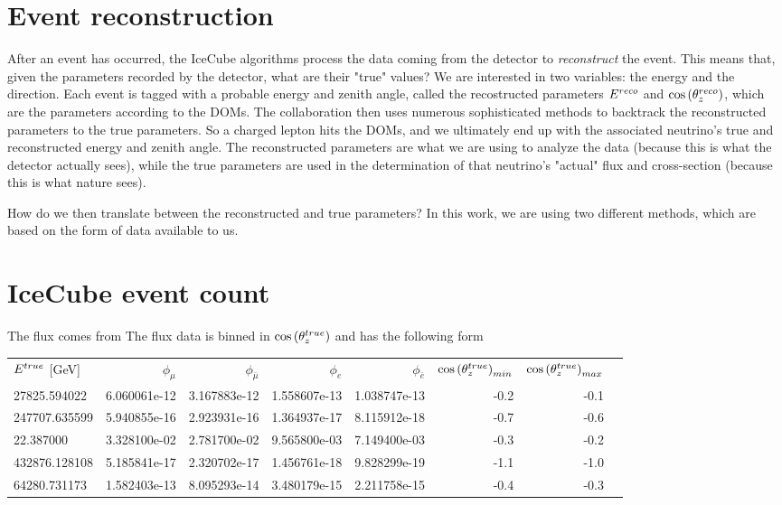 \documentclass[draft=True]{thesis}
\begin{document}
\section{Event reconstruction}
After an event has occurred, the IceCube algorithms process the data coming from the detector to \emph{reconstruct} the event. This means that, given the parameters recorded by the detector, what are their "true" values?
We are interested in two variables: the energy and the direction. Each event is tagged with a probable energy and zenith angle, called the recostructed parameters $E^{reco}$ and $\cos{(\theta_z^{reco})}$, which are the parameters according to the DOMs.
The collaboration then uses numerous sophisticated methods to backtrack the reconstructed parameters to the true parameters. So a charged lepton hits the DOMs, and we ultimately end up with the associated neutrino's true and reconstructed energy and zenith angle. The reconstructed parameters are what we are using to analyze the data (because this is what the detector actually sees), while the true parameters are used in the determination of that neutrino's "actual" flux and cross-section (because this is what nature sees).

How do we then translate between the reconstructed and true parameters? In this work, we are using two different methods, which are based on the form of data available to us. 

\section{IceCube event count}\label{ch:ICmethod}

The flux comes from \cite{hondapaper} %
The flux data is binned in $\cos{(\theta_z^{true})}$ and has the following form

\begin{tabular}{lrrrrrrr}
           $E^{true}$ [\si{\GeV}] &        $\phi_\mu$ &     $\phi_\bar{\mu}$ &        $\phi_e$ &     $\phi_{\bar{e}}$ &  $\cos{(\theta_z^{true})}_{min}$ &  $\cos{(\theta_z^{true})}_{max}$\\
       27825.594022 &  6.060061e-12 &  3.167883e-12 &  1.558607e-13 &  1.038747e-13 &   -0.2 &   -0.1 \\
      247707.635599 &  5.940855e-16 &  2.923931e-16 &  1.364937e-17 &  8.115912e-18 &   -0.7 &   -0.6 \\
         22.387000 &  3.328100e-02 &  2.781700e-02 &  9.565800e-03 &  7.149400e-03 &   -0.3 &   -0.2 \\
      432876.128108 &  5.185841e-17 &  2.320702e-17 &  1.456761e-18 &  9.828299e-19 &   -1.1 &   -1.0 \\
       64280.731173 &  1.582403e-13 &  8.095293e-14 &  3.480179e-15 &  2.211758e-15 &   -0.4 &   -0.3 \\
\end{tabular}
\end{document}
